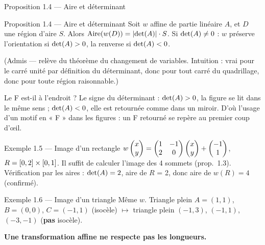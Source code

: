 \begin{frame}{Proposition 1.4 --- Aire et déterminant}
  \begin{Enonce}{Proposition 1.4 --- Aire et déterminant}
    Soit $w$ affine de partie linéaire $A$, et $D$ une région d'aire
    $S$. Alors $\operatorname{Aire}(w(D)) = \lvert \operatorname{det}(A)\rvert \cdot S$. Si
    $\operatorname{det}(A) \neq 0$ : $w$ préserve l'orientation si $\operatorname{det}(A)>0$, la
    renverse si $\operatorname{det}(A)<0$.
  \end{Enonce}
  \small (Admis --- relève du théorème du changement de variables.
  Intuition : vrai pour le carré unité par définition du déterminant,
  donc pour tout carré du quadrillage, donc pour toute région
  raisonnable.)
  \begin{Classe}{Le F est-il à l'endroit ?}
    \small Le signe du déterminant : $\operatorname{det}(A)>0$, la figure se lit
    dans le même sens ; $\operatorname{det}(A)<0$, elle est retournée comme dans un
    miroir. D'où l'usage d'un motif en « F » dans les figures : un F
    retourné se repère au premier coup d'œil.
  \end{Classe}
\end{frame}

\begin{frame}{Exemple 1.5 --- Image d'un rectangle}
  \small $w\begin{pmatrix}x\\ y\end{pmatrix} = \begin{pmatrix}1 & -1\\ 2 & 0\end{pmatrix}\begin{pmatrix}x\\ y\end{pmatrix}+\begin{pmatrix}-1\\ 1\end{pmatrix}$,
  $R=\mathopen{[}{0},{2}\mathclose{]}\times\mathopen{[}{0},{1}\mathclose{]}$. Il suffit de calculer l'image des
  4 sommets (prop.~1.3).
  Vérification par les aires : $\operatorname{det}(A) = 2$, aire de $R$ = 2, donc
  aire de $w(R) = 4$ (confirmé).
\end{frame}

\begin{frame}{Exemple 1.6 --- Image d'un triangle}
  \small Même $w$. Triangle plein $A=(1,1)$, $B=(0,0)$, $C=(-1,1)$
  (isocèle) $\longmapsto$ triangle plein $(-1,3)$, $(-1,1)$, $(-3,-1)$
  (\textbf{pas} isocèle).

  \vspace{6pt}
  \textbf{Une transformation affine ne respecte pas les longueurs.}
\end{frame}
